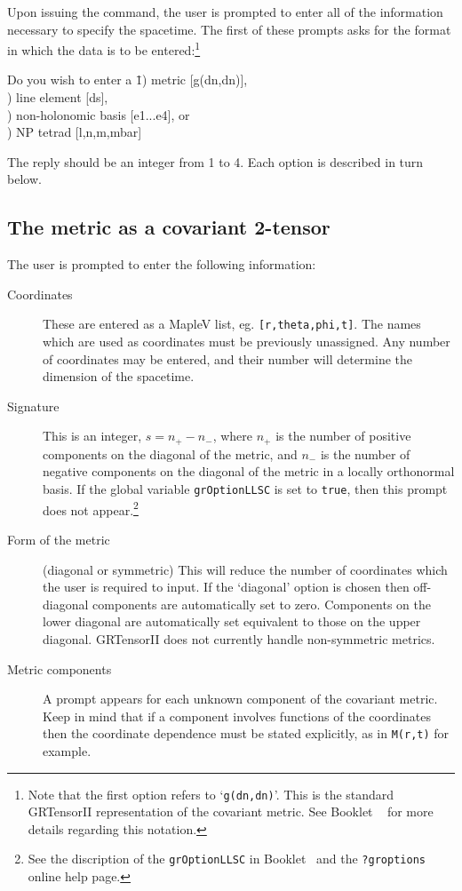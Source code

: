 \documentclass{article}
\begin{document}
Upon issuing the  command, the user is prompted to
enter all of the information necessary to specify the spacetime.
The first of these prompts asks for the format in
which the data is to be entered:\footnote{Note 
that the first option refers to `\texttt{g(dn,dn)}'. This is the standard
GRTensorII representation of the covariant metric. See Booklet \grCalcRef~
for more details regarding this notation.}
\begin{ttfamily}
  \begin{tabbing}
    Do you wish to enter a \= 1) metric [g(dn,dn)], \\
                           ) line element [ds], \\
                           ) non-holonomic basis [e1...e4], or \\
                           ) NP tetrad [l,n,m,mbar]
  \end{tabbing}
\end{ttfamily}
The reply should be an integer from 1 to 4. Each option is described in turn
below.
%
\subsection{The metric as a covariant 2-tensor} \label{sec:metricentry}
%
The user is prompted to enter the following information:
\begin{description}
  \item[Coordinates] These are entered as a MapleV list,
    eg. \texttt{[r,theta,phi,t]}. The names which are used as coordinates
    must be previously unassigned. Any number of coordinates may be entered,
    and their number will determine the dimension of the spacetime.
  \item[Signature] This is an integer, $s = n_+ - n_-$, where $n_+$ is
    the number of positive components on the diagonal of the metric, and
    $n_-$ is the number of negative components on the diagonal of the
    metric in a locally orthonormal basis. If the global variable
    \texttt{grOptionLLSC} is set to \texttt{true}, then this prompt does
    not appear.\footnote{See the discription of the \texttt{grOptionLLSC}
    in Booklet \grSetupRef~and the \texttt{?groptions} online help page.}
  \item[Form of the metric] (diagonal or symmetric) This will reduce the
    number of coordinates which the user is required to input. If the
    `diagonal' option is chosen then off-diagonal components are automatically
    set to zero. Components on the lower diagonal are automatically
    set equivalent to those on the upper diagonal.  GRTensorII
    does not currently handle non-symmetric metrics.
  \item[Metric components] A prompt appears for each unknown component of
    the covariant metric. Keep in mind that if a component involves functions
    of the coordinates then the coordinate dependence must be stated
    explicitly, as in \texttt{M(r,t)} for example.
\end{description}
%
\end{document}
